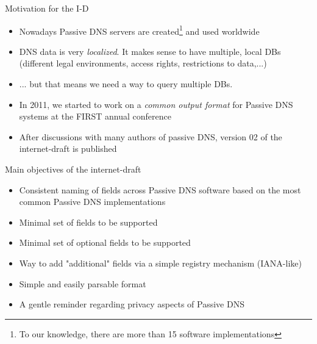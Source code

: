 \begin{frame}[t]{Motivation for the I-D}
\begin{itemize}
\item Nowadays Passive DNS servers are created\footnote{To our knowledge, there are more than 15 software implementations} and used worldwide
\item DNS data is very \emph{localized}. It makes sense to have multiple, local DBs (different legal environments, access rights, restrictions to data,...)
\item ... but that means we need a way to query multiple DBs.
\item In 2011, we started to work on a \emph{common output format} for Passive DNS systems at the FIRST annual conference
\item After discussions with many authors of passive DNS, version 02 of the internet-draft is published
\end{itemize}
\end{frame}


\begin{frame}[t]{Main objectives of the internet-draft}
\begin{itemize}
\item Consistent naming of fields across Passive DNS software based on the most common Passive DNS implementations
\item Minimal set of fields to be supported
\item Minimal set of optional fields to be supported
\item Way to add "additional" fields via a simple registry mechanism (IANA-like)
\item Simple and easily parsable format
\item A gentle reminder regarding privacy aspects of Passive DNS
\end{itemize}
\end{frame}

